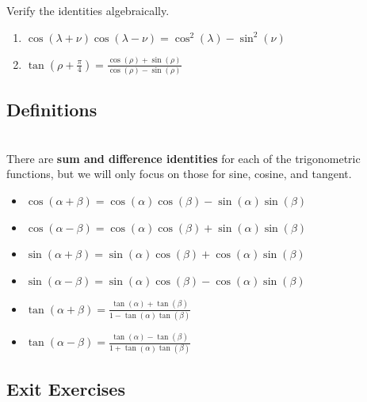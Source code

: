 \begin{myPractice}
	Verify the identities algebraically.
	\begin{enumerate}
		\item $\cos(\lambda+\nu)\cos(\lambda-\nu)=\cos^2(\lambda)-\sin^2(\nu)$
		\vfill
		\vfill
		\item $\tan\left(\rho+\frac{\pi}{4}\right)=\frac{\cos(\rho)+\sin(\rho)}{\cos(\rho)-\sin(\rho)}$
		\vfill
		\vfill
	\end{enumerate}
\end{myPractice}

\newpage

\subsection*{Definitions} \label{definitions-sum-and-difference-identities}

\begin{myDefinition}~\\[0.5mm]
There are \textbf{sum and difference identities} for each of the trigonometric functions, but we will only focus on those for sine, cosine, and tangent.
	\begin{itemize}
		\item $\cos(\alpha+\beta)=\cos(\alpha)\cos(\beta)-\sin(\alpha)\sin(\beta)$
		\vfill
		\item $\cos(\alpha-\beta)=\cos(\alpha)\cos(\beta)+\sin(\alpha)\sin(\beta)$
		\vfill
		\item $\sin(\alpha+\beta)=\sin(\alpha)\cos(\beta)+\cos(\alpha)\sin(\beta)$
		\vfill
		\item $\sin(\alpha-\beta)=\sin(\alpha)\cos(\beta)-\cos(\alpha)\sin(\beta)$
		\vfill
		\item $\tan(\alpha+\beta)=\frac{\tan(\alpha)+\tan(\beta)}{1-\tan(\alpha)\tan(\beta)}$
		\vfill
		\item $\tan(\alpha-\beta)=\frac{\tan(\alpha)-\tan(\beta)}{1+\tan(\alpha)\tan(\beta)}$
		\vfill
	\end{itemize}
\end{myDefinition}


\newpage

\subsection*{Exit Exercises} \label{exit-exercises-section-sum-and-difference-identities}

